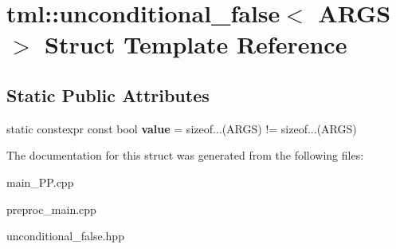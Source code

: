 \hypertarget{structtml_1_1unconditional__false}{\section{tml\+:\+:unconditional\+\_\+false$<$ A\+R\+G\+S $>$ Struct Template Reference}
\label{structtml_1_1unconditional__false}
}
\subsection*{Static Public Attributes}
\begin{DoxyCompactItemize}
\item 
\hypertarget{structtml_1_1unconditional__false_aa61caa6547e62887c5c28b0b3918dad1}{static constexpr const bool {\bfseries value} = sizeof...(A\+R\+G\+S) != sizeof...(A\+R\+G\+S)}\label{structtml_1_1unconditional__false_aa61caa6547e62887c5c28b0b3918dad1}

\end{DoxyCompactItemize}


The documentation for this struct was generated from the following files\+:\begin{DoxyCompactItemize}
\item 
main\+\_\+\+P\+P.\+cpp\item 
preproc\+\_\+main.\+cpp\item 
unconditional\+\_\+false.\+hpp\end{DoxyCompactItemize}
